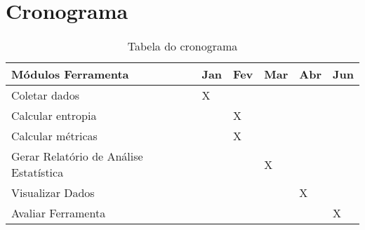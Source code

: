 \chapter{Cronograma}
\begin{table}[]
\centering
\caption{Tabela do cronograma}
\label{cronograma}
\begin{tabular}{|l|l|l|l|l|l|}
\hline
Módulos Ferramenta                     & Jan & Fev & Mar & Abr & Jun \\ \hline
Coletar dados                          & X   &     &     &     &     \\ \hline
Calcular entropia                      &     & X   &     &     &     \\ \hline
Calcular métricas                      &     & X   &     &     &     \\ \hline
Gerar Relatório de Análise Estatística &     &     & X   &     &     \\ \hline
Visualizar Dados                       &     &     &     & X   &     \\ \hline
Avaliar Ferramenta                     &     &     &     &     & X   \\ \hline
\end{tabular}
\end{table}